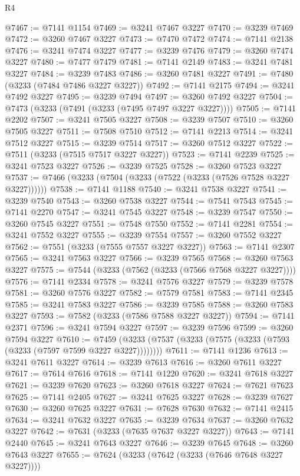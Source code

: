 \begin{lexlean}{R4}
\begin{coremodule}
@7467 := @7141 @1154
@7469 := @3241 @7467 @3227
@7470 := @3239 @7469
@7472 := @3260 @7467 @3227
@7473 := @7470 @7472
@7474 := @7141 @2138
@7476 := @3241 @7474 @3227
@7477 := @3239 @7476
@7479 := @3260 @7474 @3227
@7480 := @7477 @7479
@7481 := @7141 @2149
@7483 := @3241 @7481 @3227
@7484 := @3239 @7483
@7486 := @3260 @7481 @3227
@7491 := @7480 (@3233 (@7484 @7486 @3227 @3227))
@7492 := @7141 @2175
@7494 := @3241 @7492 @3227
@7495 := @3239 @7494
@7497 := @3260 @7492 @3227
@7504 := @7473 (@3233 (@7491 (@3233 (@7495 @7497 @3227 @3227))))
@7505 := @7141 @2202
@7507 := @3241 @7505 @3227
@7508 := @3239 @7507
@7510 := @3260 @7505 @3227
@7511 := @7508 @7510
@7512 := @7141 @2213
@7514 := @3241 @7512 @3227
@7515 := @3239 @7514
@7517 := @3260 @7512 @3227
@7522 := @7511 (@3233 (@7515 @7517 @3227 @3227))
@7523 := @7141 @2239
@7525 := @3241 @7523 @3227
@7526 := @3239 @7525
@7528 := @3260 @7523 @3227
@7537 := @7466 (@3233 (@7504 (@3233 (@7522 (@3233 (@7526 @7528 @3227 @3227))))))
@7538 := @7141 @1188
@7540 := @3241 @7538 @3227
@7541 := @3239 @7540
@7543 := @3260 @7538 @3227
@7544 := @7541 @7543
@7545 := @7141 @2270
@7547 := @3241 @7545 @3227
@7548 := @3239 @7547
@7550 := @3260 @7545 @3227
@7551 := @7548 @7550
@7552 := @7141 @2281
@7554 := @3241 @7552 @3227
@7555 := @3239 @7554
@7557 := @3260 @7552 @3227
@7562 := @7551 (@3233 (@7555 @7557 @3227 @3227))
@7563 := @7141 @2307
@7565 := @3241 @7563 @3227
@7566 := @3239 @7565
@7568 := @3260 @7563 @3227
@7575 := @7544 (@3233 (@7562 (@3233 (@7566 @7568 @3227 @3227))))
@7576 := @7141 @2334
@7578 := @3241 @7576 @3227
@7579 := @3239 @7578
@7581 := @3260 @7576 @3227
@7582 := @7579 @7581
@7583 := @7141 @2345
@7585 := @3241 @7583 @3227
@7586 := @3239 @7585
@7588 := @3260 @7583 @3227
@7593 := @7582 (@3233 (@7586 @7588 @3227 @3227))
@7594 := @7141 @2371
@7596 := @3241 @7594 @3227
@7597 := @3239 @7596
@7599 := @3260 @7594 @3227
@7610 := @7459 (@3233 (@7537 (@3233 (@7575 (@3233 (@7593 (@3233 (@7597 @7599 @3227 @3227))))))))
@7611 := @7141 @1236
@7613 := @3241 @7611 @3227
@7614 := @3239 @7613
@7616 := @3260 @7611 @3227
@7617 := @7614 @7616
@7618 := @7141 @1220
@7620 := @3241 @7618 @3227
@7621 := @3239 @7620
@7623 := @3260 @7618 @3227
@7624 := @7621 @7623
@7625 := @7141 @2405
@7627 := @3241 @7625 @3227
@7628 := @3239 @7627
@7630 := @3260 @7625 @3227
@7631 := @7628 @7630
@7632 := @7141 @2415
@7634 := @3241 @7632 @3227
@7635 := @3239 @7634
@7637 := @3260 @7632 @3227
@7642 := @7631 (@3233 (@7635 @7637 @3227 @3227))
@7643 := @7141 @2440
@7645 := @3241 @7643 @3227
@7646 := @3239 @7645
@7648 := @3260 @7643 @3227
@7655 := @7624 (@3233 (@7642 (@3233 (@7646 @7648 @3227 @3227))))

\end{coremodule}
\end{lexlean}
